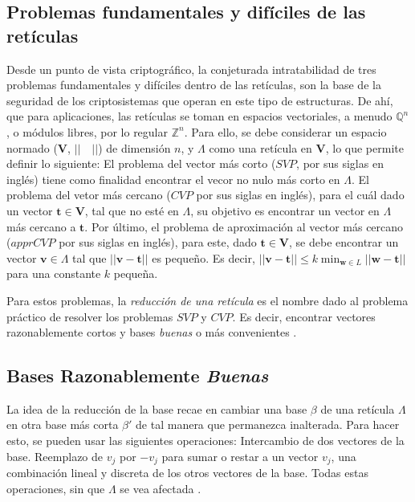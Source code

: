 \documentclass{llncs}
\begin{document}
	\subsection{Problemas fundamentales y dif\'iciles de las ret\'iculas}
	Desde un punto de vista criptogr\'afico, la conjeturada intratabilidad de tres problemas fundamentales y dif\'iciles dentro de las ret\'iculas, son la base de la seguridad de los criptosistemas que operan en este tipo de estructuras. De ah\'i, que para aplicaciones, las ret\'iculas se toman en espacios vectoriales, a menudo $ \mathbb {Q}^{n}$, o m\'odulos libres, por lo regular $\mathbb{Z}^{n}$. Para ello, se debe considerar un espacio normado (\textbf{V}, $|| \quad||$) de dimensi\'on $n$, y $\Lambda$ como una ret\'icula en \textbf{V}, lo que permite definir lo siguiente: El problema del vector m\'as corto ($SVP$, por sus siglas en ingl\'es) tiene como finalidad encontrar el vecor no nulo m\'as corto en $\Lambda$.  El problema del vetor m\'as cercano ($CVP$ por sus siglas en ingl\'es), para el cu\'al dado un vector $\mathbf{t} \in$\textbf{V}, tal que no esté en $\Lambda$, su objetivo es encontrar un vector en $\Lambda$ más cercano a $\mathbf{t}$. Por último, el problema de aproximaci\'on al vector m\'as cercano ($apprCVP$ por sus siglas en ingl\'es), para este, dado $\mathbf{t}\in$\textbf{V}, se debe encontrar un vector $\mathbf{v} \in \Lambda$ tal que $||\mathbf{v}-\mathbf{t}||$ es pequeño. Es decir, $||\mathbf{v}-\mathbf{t}||\leq k \displaystyle\min_{\mathbf{w} \in L}||\mathbf{w}-\mathbf{t}|| $ para una constante $k$ pequeña.

	Para estos problemas, la \textit{reducci\'on de una ret\'icula} es el nombre dado al problema pr\'actico de resolver los problemas $SVP$ y $CVP$. Es decir, encontrar vectores razonablemente cortos y bases \textit{buenas} o m\'as convenientes \cite{b12}.

	\subsection{Bases Razonablemente \textit{Buenas}}
	La idea de la reducción de la base recae en cambiar una base $\beta$ de una retícula $\Lambda$ en otra base más corta $\beta'$ de tal manera que permanezca inalterada. Para hacer esto, se pueden usar las siguientes operaciones: Intercambio de dos vectores de la base. Reemplazo de $v_{j}$ por ${-v}_{j}$ para sumar o restar a un vector $v_{j}$, una combinación lineal y discreta de los otros vectores de la base. Todas estas operaciones, sin que $\Lambda$ se vea afectada \cite{b13}.
\end{document}

